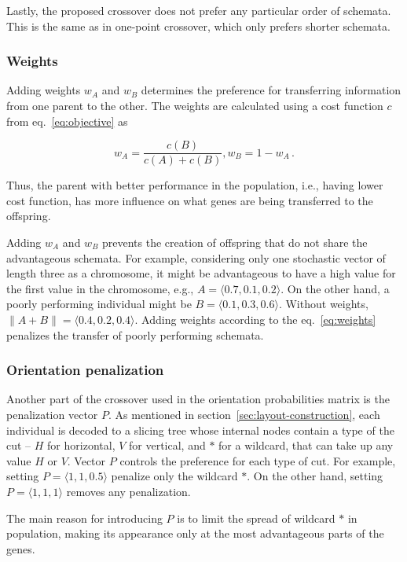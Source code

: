 Lastly, the proposed crossover does not prefer any particular order of schemata.
This is the same as in one-point crossover, which only prefers shorter schemata.


\subsubsection*{Weights}
Adding weights $w_A$ and $w_B$ determines the preference for transferring information from one parent to the other.
The weights are calculated using a cost function $c$ from eq.~\ref{eq:objective} as

\begin{equation}
    w_A = \dfrac{c(B)}{c(A)+{c(B)}}, w_B = 1 - w_A\,.
    \label{eq:weights}
\end{equation}

Thus, the parent with better performance in the population, i.e., having lower cost function,
has more influence on what genes are being transferred to the offspring.

Adding $w_A$ and $w_B$ prevents the creation of offspring that do not share the advantageous schemata.
For example, considering only one stochastic vector of length three as a chromosome,
it might be advantageous to have a high value for the first value in the chromosome, e.g., $A=\langle 0.7, 0.1, 0.2 \rangle$.
On the other hand, a poorly performing individual might be $B=\langle 0.1, 0.3, 0.6 \rangle$.
Without weights, $\| A+B\| = \langle 0.4, 0.2 , 0.4 \rangle$.
Adding weights according to the eq.~\ref{eq:weights} penalizes the transfer of poorly performing schemata.

\subsubsection*{Orientation penalization}

Another part of the crossover used in the orientation probabilities matrix is the penalization vector $P$.
As mentioned in section~\ref{sec:layout-construction}, each individual is decoded to a slicing tree
whose internal nodes contain a type of the cut – $H$ for horizontal, $V$ for vertical, and $*$ for a wildcard, that can take up any value $H$ or $V$.
Vector $P$ controls the preference for each type of cut.
For example, setting $P= \langle 1,1,0.5 \rangle$ penalize only the wildcard $*$.
On the other hand, setting $P= \langle 1,1,1 \rangle$ removes any penalization.

The main reason for introducing $P$ is to limit the spread of wildcard $*$ in population,
making its appearance only at the most advantageous parts of the genes.

